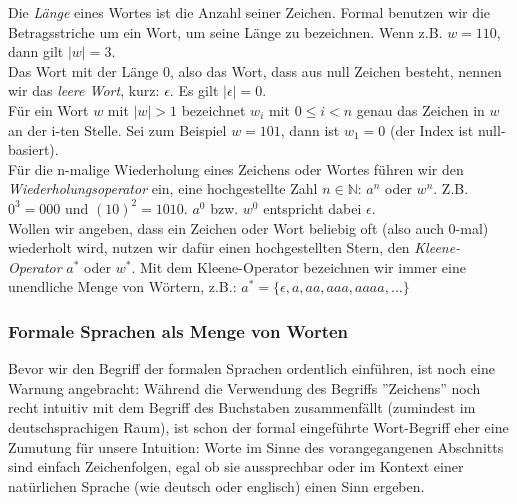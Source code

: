\noindent
Die \emph{Länge} eines Wortes ist die Anzahl seiner Zeichen.
Formal benutzen wir die Betragsstriche um ein Wort, um seine
Länge zu bezeichnen. Wenn z.B. $w = 110$, dann gilt $|w| = 3$.\\

\noindent
Das Wort mit der Länge 0, also das Wort, dass aus null Zeichen besteht,
nennen wir das \emph{leere Wort}, kurz: $\epsilon$.
Es gilt $|\epsilon| = 0$.\\

\noindent
Für ein Wort $w$ mit $|w| > 1$ bezeichnet $w_i$ mit $0 \leq i < n$
genau das Zeichen in $w$ an der i-ten Stelle.
Sei zum Beispiel $w = 101$, dann ist $w_1 = 0$ (der Index ist null-basiert).\\

\noindent
Für die n-malige Wiederholung eines Zeichens oder Wortes führen wir den \emph{Wiederholungsoperator}
ein, eine hochgestellte Zahl $n \in \mathbb{N}$: $a^n$ oder $w^n$.
Z.B. $0^3 = 000$ und $(10)^2 = 1010$.
$a^0$ bzw. $w^0$ entspricht dabei $\epsilon$.\\

\noindent
Wollen wir angeben, dass ein Zeichen oder Wort beliebig oft (also auch 0-mal) wiederholt
wird, nutzen wir dafür einen hochgestellten Stern, den \emph{Kleene-Operator} $a^*$ oder $w^*$.
Mit dem Kleene-Operator bezeichnen wir immer eine unendliche Menge von Wörtern, z.B.:
$a^* = \{\epsilon, a, aa, aaa, aaaa, \dots\}$

\subsubsection{Formale Sprachen als Menge von Worten}

Bevor wir den Begriff der formalen Sprachen ordentlich einführen,
ist noch eine Warnung angebracht:
Während die Verwendung des Begriffs ''Zeichens''
noch recht intuitiv mit dem Begriff des Buchstaben zusammenfällt
(zumindest im deutschsprachigen Raum),
ist schon der formal eingeführte Wort-Begriff eher eine Zumutung für unsere Intuition:
Worte im Sinne des vorangegangenen Abschnitts sind einfach Zeichenfolgen,
egal ob sie aussprechbar oder im Kontext einer natürlichen Sprache
(wie deutsch oder englisch) einen Sinn ergeben.


